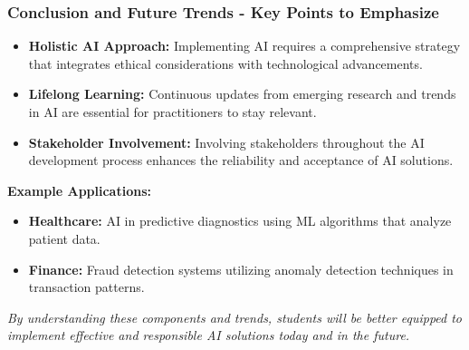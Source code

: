 \documentclass[aspectratio=169]{beamer}
\begin{document}
\begin{frame}[fragile]
    \frametitle{Conclusion and Future Trends - Key Points to Emphasize}

    \begin{itemize}
        \item \textbf{Holistic AI Approach:} Implementing AI requires a comprehensive strategy that integrates ethical considerations with technological advancements.
        \item \textbf{Lifelong Learning:} Continuous updates from emerging research and trends in AI are essential for practitioners to stay relevant.
        \item \textbf{Stakeholder Involvement:} Involving stakeholders throughout the AI development process enhances the reliability and acceptance of AI solutions.
    \end{itemize}
    
    \textbf{Example Applications:}
    \begin{itemize}
        \item \textbf{Healthcare:} AI in predictive diagnostics using ML algorithms that analyze patient data.
        \item \textbf{Finance:} Fraud detection systems utilizing anomaly detection techniques in transaction patterns.
    \end{itemize}
    
    \textit{By understanding these components and trends, students will be better equipped to implement effective and responsible AI solutions today and in the future.}
\end{frame}
\end{document}
